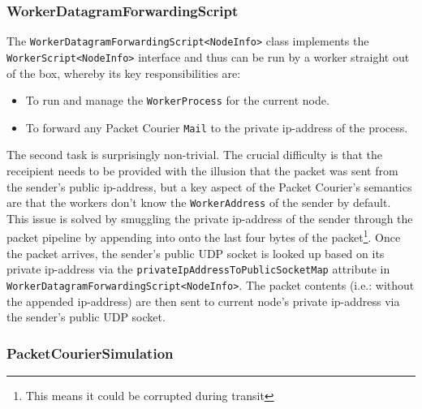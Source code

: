 \subsubsection{WorkerDatagramForwardingScript}

The \texttt{WorkerDatagramForwardingScript<NodeInfo>} class implements the \texttt{WorkerScript<NodeInfo>} interface
and thus can be run by a worker straight out of the box, whereby its key responsibilities are:
\begin{itemize}
    \item To run and manage the \texttt{WorkerProcess} for the current node.
    \item To forward any Packet Courier \texttt{Mail} to the private ip-address of the process.
\end{itemize}

The second task is surprisingly non-trivial. The crucial difficulty is that the receipient needs to be provided with
the illusion that the packet was sent from the sender's public ip-address, but a key aspect of the Packet Courier's
semantics are that the workers don't know the \texttt{WorkerAddress} of the sender by default. This issue is solved
by smuggling the private ip-address of the sender through the packet pipeline by appending into onto the last four
bytes of the packet\footnote{This means it could be corrupted during transit}. Once the packet arrives, the sender's
public UDP socket is looked up based on its private ip-address via the \texttt{privateIpAddressToPublicSocketMap}
attribute in \texttt{WorkerDatagramForwardingScript<NodeInfo>}. The packet contents (i.e.: without the appended
ip-address) are then sent to current node's private ip-address via the sender's public UDP socket.

\subsubsection{PacketCourierSimulation}

